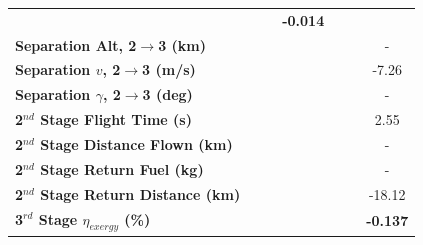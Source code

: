 \begin{table}[ht]
\begin{tabular}{l c c c c c c}
		& \textbf{\secondExergyEffmSPARTANOneHundredFive}
		& \textbf{\secondExergyEffmSPARTANOneHundredTen}
		& \textbf{-0.014}
		\\
		\textbf{Separation Alt, 2$\rightarrow$3 (km)}
		& \secondthirdSeparationAltmSPARTANNinety
		& \secondthirdSeparationAltmSPARTANNinetyFive
		& \secondthirdSeparationAltmSPARTANStandard
		& \secondthirdSeparationAltmSPARTANOneHundredFive
		& \secondthirdSeparationAltmSPARTANOneHundredTen
		& -
		\\
		\textbf{Separation $v$, 2$\rightarrow$3 (m/s)}
		& \secondthirdSeparationvmSPARTANNinety
		& \secondthirdSeparationvmSPARTANNinetyFive
		& \secondthirdSeparationvmSPARTANStandard
		& \secondthirdSeparationvmSPARTANOneHundredFive
		& \secondthirdSeparationvmSPARTANOneHundredTen
		&-7.26
		\\
		\textbf{Separation $\gamma$, 2$\rightarrow$3 (deg)}
		& \secondthirdSeparationgammamSPARTANNinety
		& \secondthirdSeparationgammamSPARTANNinetyFive
		& \secondthirdSeparationgammamSPARTANStandard
		& \secondthirdSeparationgammamSPARTANOneHundredFive
		& \secondthirdSeparationgammamSPARTANOneHundredTen
		& -
		\\
		\textbf{2$^{nd}$ Stage Flight Time (s)}
		& \secondFlightTimemSPARTANNinety
		& \secondFlightTimemSPARTANNinetyFive
		& \secondFlightTimemSPARTANStandard
		& \secondFlightTimemSPARTANOneHundredFive
		& \secondFlightTimemSPARTANOneHundredTen
		&2.55
		\\
		\textbf{2$^{nd}$ Stage Distance Flown (km)}
		& \SecondDistmSPARTANNinety
		& \SecondDistmSPARTANNinetyFive
		& \SecondDistmSPARTANStandard
		& \SecondDistmSPARTANOneHundredFive
		& \SecondDistmSPARTANOneHundredTen
		& -
		\\
		\textbf{2$^{nd}$ Stage Return Fuel (kg)}
		& \returnFuelmSPARTANNinety
		& \returnFuelmSPARTANNinetyFive
		& \returnFuelmSPARTANStandard
		& \returnFuelmSPARTANOneHundredFive
		& \returnFuelmSPARTANOneHundredTen
		& -
		\\
		\textbf{2$^{nd}$ Stage Return Distance (km)}
		& \returnDistmSPARTANNinety
		& \returnDistmSPARTANNinetyFive
		& \returnDistmSPARTANStandard
		& \returnDistmSPARTANOneHundredFive
		& \returnDistmSPARTANOneHundredTen
		&-18.12
		\\
		\hline 
		\textbf{3$^{rd}$ Stage $\eta_{exergy}$ (\%)}
		& \textbf{\thirddExergyEffmSPARTANNinety}
		& \textbf{\thirddExergyEffmSPARTANNinetyFive}
		& \textbf{\thirddExergyEffmSPARTANStandard}
		& \textbf{\thirddExergyEffmSPARTANOneHundredFive}
		& \textbf{\thirddExergyEffmSPARTANOneHundredTen}
		& \textbf{-0.137}

\end{tabular}
\end{table}
